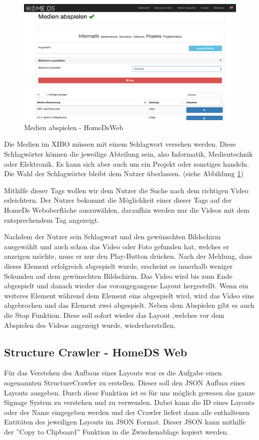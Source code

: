 \begin{figure}[H]
\centering
\includegraphics[width=1\textwidth]{images/08_HomeDsWeb/PlayMediaOverview.png}
\caption{Medien abspielen - HomeDsWeb}
\label{img:playmedia}
\end{figure}

Die Medien im XIBO müssen mit einem Schlagwort versehen werden. Diese Schlagwörter können die jeweilige Abteilung sein, also Informatik, Medientechnik oder Elektronik. Es kann sich aber auch um ein Projekt oder sonstiges handeln. Die Wahl der Schlagwörter bleibt dem Nutzer überlassen. (siehe Abbildung \ref{img:playmedia})

Mithilfe dieser Tags wollen wir dem Nutzer die Suche nach dem richtigen Video erleichtern. Der Nutzer bekommt die Möglichkeit einer dieser Tags auf der HomeDs Weboberfläche auszuwählen, daraufhin werden nur die Videos mit dem entsprechendem Tag angezeigt.

Nachdem der Nutzer sein Schlagwort und den gewünschten Bildschirm ausgewählt und auch schon das Video oder Foto gefunden hat, welches er anzeigen möchte, muss er nur den Play-Button drücken. Nach der Meldung, dass dieses Element erfolgreich abgespielt wurde, erscheint es innerhalb weniger Sekunden auf dem gewünschten Bildschirm. Das Video wird bis zum Ende abgespielt und danach wieder das vorangegangene Layout hergestellt. Wenn ein weiteres Element während dem Element eins abgespielt wird, wird das Video eins abgebrochen und das Element zwei abgespielt. Neben dem Abspielen gibt es auch die Stop Funktion. Diese soll sofort wieder das Layout ,welches vor dem Abspielen des Videos angezeigt wurde, wiederherstellen.


\subsection{Structure Crawler - HomeDS Web}\label{sec:javaeestructurecrawler}
Für das Verstehen des Aufbaus eines Layouts war es die Aufgabe einen sogenannten StructureCrawler zu erstellen. Dieser soll den JSON Aufbau eines Layouts ausgeben. Durch diese Funktion ist es für uns möglich gewesen das ganze Signage System zu verstehen und zu verwenden. Dabei kann die ID eines Layouts oder der Name eingegeben werden und der Crawler liefert dann alle enthaltenen Entitäten des jeweiligen Layouts im JSON Format. Dieser JSON kann mithilfe der ''Copy to Clipboard'' Funktion in die Zwischenablage kopiert werden.

